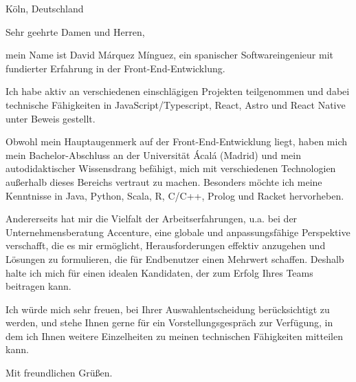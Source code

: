 \documentclass[letterpaper,11pt]{letter}
\begin{document}
\begin{letter}{Köln, Deutschland}
\address{Am Kapellenbusch, 50374 Erftstadt}

\opening{Sehr geehrte Damen und Herren,}

mein Name ist David Márquez Mínguez, ein spanischer Softwareingenieur mit fundierter Erfahrung in der Front-End-Entwicklung. 

Ich habe aktiv an verschiedenen einschlägigen Projekten teilgenommen und dabei technische Fähigkeiten in JavaScript/Typescript, React, 
Astro und React Native unter Beweis gestellt. 

Obwohl mein Hauptaugenmerk auf der Front-End-Entwicklung liegt, haben mich mein Bachelor-Abschluss an der Universität Ácalá (Madrid) und 
mein autodidaktischer Wissensdrang befähigt, mich mit verschiedenen Technologien außerhalb dieses Bereichs vertraut zu machen. Besonders 
möchte ich meine Kenntnisse in Java, Python, Scala, R, C/C++, Prolog und Racket hervorheben. 

Andererseits hat mir die Vielfalt der Arbeitserfahrungen, u.a. bei der Unternehmensberatung Accenture, eine globale und anpassungsfähige
 Perspektive verschafft, die es mir ermöglicht, Herausforderungen effektiv anzugehen und Lösungen zu formulieren, die für Endbenutzer einen 
Mehrwert schaffen. Deshalb halte ich mich für einen idealen Kandidaten, der zum Erfolg Ihres Teams beitragen kann. 

Ich würde mich sehr freuen, bei Ihrer Auswahlentscheidung berücksichtigt zu werden, und stehe Ihnen gerne für ein Vorstellungsgespräch zur
Verfügung, in dem ich Ihnen weitere Einzelheiten zu meinen technischen Fähigkeiten mitteilen kann.

\signature{\vspace{-35pt}David Márquez Mínguez}
\closing{Mit freundlichen Grüßen.}




\end{letter}
\end{document}
